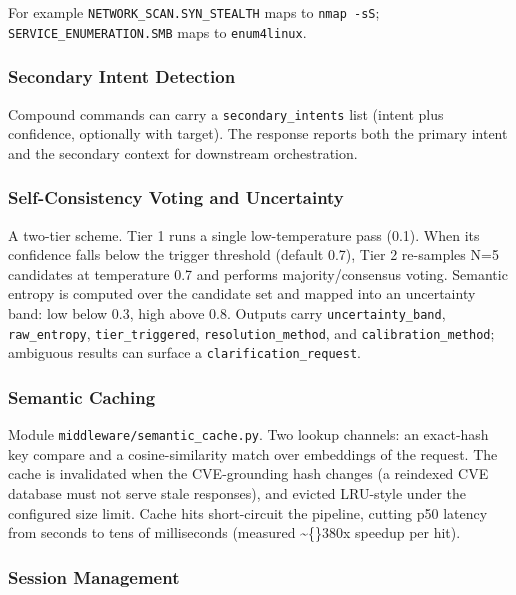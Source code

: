 \documentclass[10pt,journal,onecolumn]{IEEEtran}
\begin{document}
For example \texttt{NETWORK\_\allowbreak SCAN.\allowbreak SYN\_\allowbreak STEALTH} maps to \texttt{nmap -sS}; \texttt{SERVICE\_ENUMERATION.SMB} maps to \texttt{enum4linux}.

\subsubsection{Secondary Intent Detection}

Compound commands can carry a \texttt{secondary\_intents} list (intent plus confidence, optionally with target). The response reports both the primary intent and the secondary context for downstream orchestration.

\subsubsection{Self-Consistency Voting and Uncertainty}

A two-tier scheme. Tier 1 runs a single low-temperature pass (0.1). When its confidence falls below the trigger threshold (default 0.7), Tier 2 re-samples N=5 candidates at temperature 0.7 and performs majority/consensus voting. Semantic entropy is computed over the candidate set and mapped into an uncertainty band: low below 0.3, high above 0.8. Outputs carry \texttt{uncertainty\_band}, \texttt{raw\_entropy}, \texttt{tier\_triggered}, \texttt{resolution\_method}, and \texttt{calibration\_method}; ambiguous results can surface a \texttt{clarification\_request}.

\subsubsection{Semantic Caching}

Module \texttt{middleware/\allowbreak semantic\_\allowbreak cache.\allowbreak py}. Two lookup channels: an exact-hash key compare and a cosine-similarity match over embeddings of the request. The cache is invalidated when the CVE-grounding hash changes (a reindexed CVE database must not serve stale responses), and evicted LRU-style under the configured size limit. Cache hits short-circuit the pipeline, cutting p50 latency from seconds to tens of milliseconds (measured \textasciitilde\{\}380x speedup per hit).

\subsubsection{Session Management}
\end{document}
